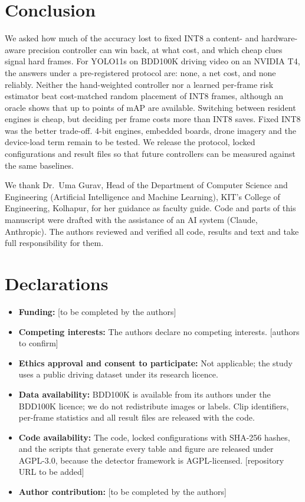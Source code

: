 \documentclass[pdflatex,sn-mathphys-num]{sn-jnl}
\begin{document}
\section{Conclusion}\label{sec:conclusion}
We asked how much of the accuracy lost to fixed INT8 a content- and hardware-aware precision controller can win back, at what cost, and which cheap clues signal hard frames. For YOLO11s on BDD100K driving video on an NVIDIA T4, the answers under a pre-registered protocol are: none, a net cost, and none reliably. Neither the hand-weighted controller nor a learned per-frame risk estimator beat cost-matched random placement of INT8 frames, although an oracle shows that up to \VHeadroomFiftyPts{} points of mAP are available. Switching between resident engines is cheap, but deciding per frame costs more than INT8 saves. Fixed INT8 was the better trade-off. 4-bit engines, embedded boards, drone imagery and the device-load term remain to be tested. We release the protocol, locked configurations and result files so that future controllers can be measured against the same baselines.

\backmatter

We thank Dr.~Uma Gurav, Head of the Department of Computer Science and Engineering (Artificial Intelligence and Machine Learning), KIT's College of Engineering, Kolhapur, for her guidance as faculty guide. Code and parts of this manuscript were drafted with the assistance of an AI system (Claude, Anthropic). The authors reviewed and verified all code, results and text and take full responsibility for them.

\section*{Declarations}
\begin{itemize}
\item \textbf{Funding:} [to be completed by the authors]
\item \textbf{Competing interests:} The authors declare no competing interests. [authors to confirm]
\item \textbf{Ethics approval and consent to participate:} Not applicable; the study uses a public driving dataset under its research licence.
\item \textbf{Data availability:} BDD100K is available from its authors under the BDD100K licence; we do not redistribute images or labels. Clip identifiers, per-frame statistics and all result files are released with the code.
\item \textbf{Code availability:} The code, locked configurations with SHA-256 hashes, and the scripts that generate every table and figure are released under AGPL-3.0, because the detector framework is AGPL-licensed. [repository URL to be added]
\item \textbf{Author contribution:} [to be completed by the authors]
\end{itemize}
\end{document}
